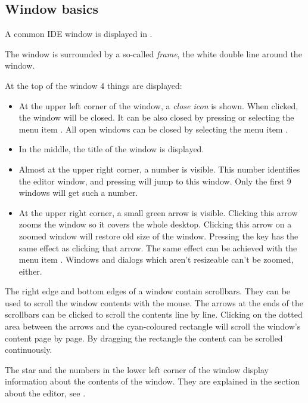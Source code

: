 \subsection{Window basics}
\label{se:windowbasics}

A common IDE window is displayed in .


The window is surrounded by a so-called \emph{frame}, the white double
line around the window.

At the top of the window 4 things are displayed:
\begin{itemize}
\item
At the upper left corner of the window, a \emph{close icon} is shown.
When clicked, the window will be closed. It can be also closed by
 pressing  or selecting the menu item .
All open windows can be closed by selecting the menu item
.
\item In the middle, the title of the window is displayed.
\item Almost at the upper right corner, a number is visible.
This number identifies the editor window, and pressing 
will jump to this window. Only the first 9 windows will get such a number.
\item At the upper right corner, a small green arrow is visible.
Clicking this arrow zooms the window so it covers the whole desktop.
Clicking this arrow on a zoomed window will restore old size of the
window. Pressing the key  has the same effect as clicking
that arrow. The same effect can be achieved with the menu item
.
Windows and dialogs which aren't resizeable can't be zoomed, either.
\end{itemize}

The right edge and bottom edges of a window contain scrollbars.
They can be used to scroll the window contents with the mouse.
The arrows at the ends of the scrollbars can be clicked to scroll the
contents line by line. Clicking on the dotted area between the arrows
and the cyan-coloured rectangle will scroll the window's content
page by page. By dragging the rectangle the content can be scrolled
continuously.

The star and the numbers in the lower left corner of the window
display information about the contents of the window. They
are explained in the section about the editor, see .

%
%
